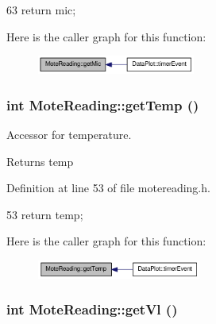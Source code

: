 \begin{DoxyCode}
63 { return mic; }
\end{DoxyCode}




Here is the caller graph for this function:\nopagebreak
\begin{figure}[H]
\begin{center}
\leavevmode
\includegraphics[width=147pt]{classMoteReading_a348cb45f4613499385a354fe6857ef5d_icgraph}
\end{center}
\end{figure}


\hypertarget{classMoteReading_a3f7526c29f2bf61feeb5e24298133332}{
\subsubsection[{getTemp}]{\setlength{\rightskip}{0pt plus 5cm}int MoteReading::getTemp ()}}
\label{classMoteReading_a3f7526c29f2bf61feeb5e24298133332}


Accessor for temperature. 

\begin{DoxyReturn}{Returns}
temp 
\end{DoxyReturn}


Definition at line 53 of file motereading.h.




\begin{DoxyCode}
53 { return temp; }
\end{DoxyCode}




Here is the caller graph for this function:\nopagebreak
\begin{figure}[H]
\begin{center}
\leavevmode
\includegraphics[width=152pt]{classMoteReading_a3f7526c29f2bf61feeb5e24298133332_icgraph}
\end{center}
\end{figure}


\hypertarget{classMoteReading_a88ed6ea245c7af79e38ff8976f849f36}{
\subsubsection[{getVl}]{\setlength{\rightskip}{0pt plus 5cm}int MoteReading::getVl ()}}
\label{classMoteReading_a88ed6ea245c7af79e38ff8976f849f36}


